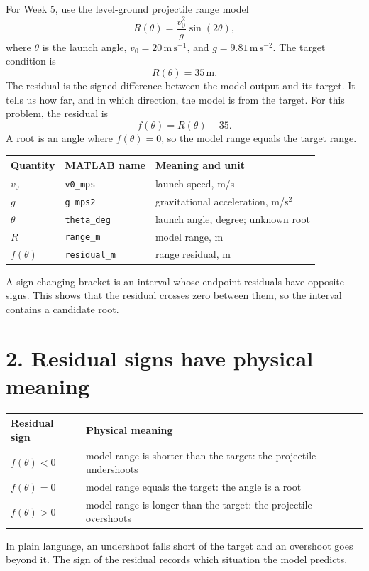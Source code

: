 \documentclass[11pt,a4paper]{article}
\newcommand{\units}[1]{\,\mathrm{#1}}
\begin{document}
For Week 5, use the level-ground projectile range model
\[
R(\theta)=\frac{v_0^2}{g}\sin(2\theta),
\]
where $\theta$ is the launch angle, $v_0=20\units{m\,s^{-1}}$, and $g=9.81\units{m\,s^{-2}}$. The target condition is
\[
R(\theta)=35\units{m}.
\]
The residual is the signed difference between the model output and its target. It tells us how far, and in which direction, the model is from the target. For this problem, the residual is
\[
f(\theta)=R(\theta)-35.
\]
A root is an angle where $f(\theta)=0$, so the model range equals the target range.

\begin{center}\small
\begin{tabular}{>{\raggedright\arraybackslash}p{.24\linewidth}>{\raggedright\arraybackslash}p{.25\linewidth}>{\raggedright\arraybackslash}p{.38\linewidth}}
\toprule
\textbf{Quantity} & \textbf{MATLAB name} & \textbf{Meaning and unit}\\
\midrule
$v_0$ & \texttt{v0\_mps} & launch speed, m/s\\
$g$ & \texttt{g\_mps2} & gravitational acceleration, m/s$^2$\\
$\theta$ & \texttt{theta\_deg} & launch angle, degree; unknown root\\
$R$ & \texttt{range\_m} & model range, m\\
$f(\theta)$ & \texttt{residual\_m} & range residual, m\\
\bottomrule
\end{tabular}
\end{center}

A sign-changing bracket is an interval whose endpoint residuals have opposite signs. This shows that the residual crosses zero between them, so the interval contains a candidate root.

\section*{2. Residual signs have physical meaning}
\begin{center}\small
\begin{tabular}{>{\raggedright\arraybackslash}p{.26\linewidth}>{\raggedright\arraybackslash}p{.56\linewidth}}
\toprule
\textbf{Residual sign} & \textbf{Physical meaning}\\
\midrule
$f(\theta)<0$ & model range is shorter than the target: the projectile undershoots\\
$f(\theta)=0$ & model range equals the target: the angle is a root\\
$f(\theta)>0$ & model range is longer than the target: the projectile overshoots\\
\bottomrule
\end{tabular}
\end{center}
In plain language, an undershoot falls short of the target and an overshoot goes beyond it. The sign of the residual records which situation the model predicts.
\end{document}
